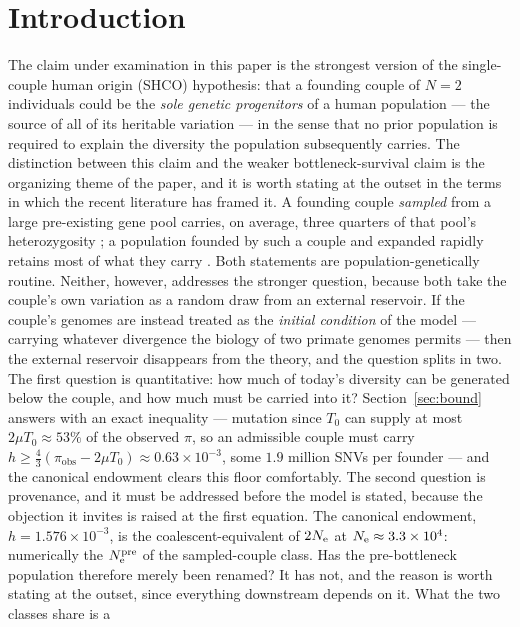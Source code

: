 \section{Introduction}\label{sec:intro}

The claim under examination in this paper is the strongest version of the
single-couple human origin (SHCO) hypothesis: that a founding couple of $N=2$
individuals could be the \emph{sole genetic progenitors} of a human
population --- the source of all of its heritable variation --- in the sense
that no prior population is required to explain the diversity the population
subsequently carries. The distinction between this claim and the weaker
bottleneck-survival claim is the organizing theme of the paper, and it is
worth stating at the outset in the terms in which the recent literature has
framed it. A founding couple
\emph{sampled} from a large pre-existing gene pool carries, on average, three
quarters of that pool's heterozygosity \citep{SlatkinExcoffier2012}; a
population founded by such a couple and expanded rapidly retains most of what
they carry \citep{Nei1975,BartonCharlesworth1984}. Both statements are
population-genetically routine. Neither, however, addresses the stronger
question, because both take the couple's own variation as a random draw from
an external reservoir. If the couple's genomes are instead treated as the
\emph{initial condition} of the model --- carrying whatever divergence the
biology of two primate genomes permits --- then the external reservoir
disappears from the theory, and the question splits in two. The first
question is quantitative: how much of today's diversity can be generated
below the couple, and how much must be carried into it? Section~\ref{sec:bound}
answers with an exact inequality --- mutation since $T_0$ can supply at most
$2\mu T_0 \approx 53\%$ of the observed $\pi$, so an admissible couple must
carry $h \ge \tfrac{4}{3}(\pi_{\mathrm{obs}} - 2\mu T_0) \approx 0.63\times10^{-3}$,
some $1.9$ million SNVs per founder --- and the canonical endowment clears
this floor comfortably. The second question is provenance, and it must be
addressed before the model is stated, because the objection it invites is
raised at the first equation. The canonical endowment,
$h = 1.576\times10^{-3}$, is the coalescent-equivalent of $2N_{\mathrm{e}}$ at
$N_{\mathrm{e}} \approx 3.3\times10^{4}$: numerically the $N_{\mathrm{e}}^{\mathrm{pre}}$ of the
sampled-couple class. Has the pre-bottleneck population therefore merely
been renamed? It has not, and the reason is worth stating at the outset,
since everything downstream depends on it. What the two classes share is a
